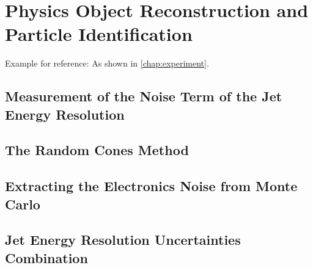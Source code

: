 
\chapter{Physics Object Reconstruction and Particle Identification}
\label{chap:objects}

Example for reference: As shown in \cref{chap:experiment}.
\section{Measurement of the Noise Term of the Jet Energy Resolution}
\section{The Random Cones Method}
\section{Extracting the Electronics Noise from Monte Carlo}
\section{Jet Energy Resolution Uncertainties Combination}